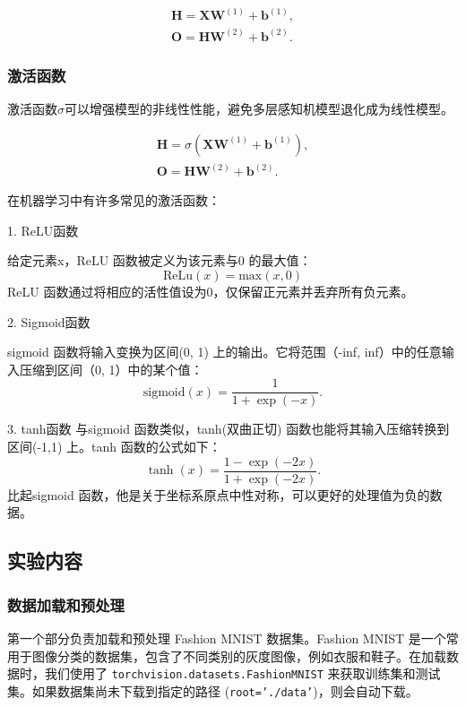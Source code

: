 \documentclass[a4paper,12pt]{article}
\begin{document}
\begin{equation}
\begin{split}
\mathbf{H} = \mathbf{XW}^{(1)} + \mathbf{b}^{(1)},\\
\mathbf{O} = \mathbf{HW}^{(2)} + \mathbf{b}^{(2)}.
\end{split}
\end{equation}

\subsubsection{激活函数}
激活函数$\sigma$可以增强模型的非线性性能，避免多层感知机模型退化成为线性模型。

\begin{equation}
\begin{split}
\mathbf{H} = \sigma(\mathbf{XW}^{(1)} + \mathbf{b}^{(1)}), \\
\mathbf{O} = \mathbf{HW}^{(2)} + \mathbf{b}^{(2)}.
\end{split}
\end{equation}

在机器学习中有许多常见的激活函数：

1. ReLU函数

给定元素x，ReLU 函数被定义为该元素与0 的最大值：
\begin{equation}
\text{ReLu}(x) = \text{max}(x,0)
\end{equation}
ReLU 函数通过将相应的活性值设为0，仅保留正元素并丢弃所有负元素。

2. Sigmoid函数

sigmoid 函数将输入变换为区间(0, 1) 上的输出。它将范围（-inf, inf）中的任意输入压缩到区间（0, 1）中的某个值：
\begin{equation}
\text{sigmoid}(x) = \frac{1}{1 + \exp(-x)}.
\end{equation}

3. tanh函数
与sigmoid 函数类似，tanh(双曲正切) 函数也能将其输入压缩转换到区间(-1,1) 上。tanh 函数的公式如下：
\begin{equation}
\tanh(x) = \frac{1 - \exp(-2x)}{1 + \exp(-2x)}.
\end{equation}
比起sigmoid 函数，他是关于坐标系原点中性对称，可以更好的处理值为负的数据。

\subsection{实验内容}
\subsubsection{数据加载和预处理}
第一个部分负责加载和预处理 Fashion MNIST 数据集。Fashion MNIST 是一个常用于图像分类的数据集，包含了不同类别的灰度图像，例如衣服和鞋子。在加载数据时，我们使用了 \texttt{torchvision.datasets.FashionMNIST} 来获取训练集和测试集。如果数据集尚未下载到指定的路径 (\texttt{root='./data'})，则会自动下载。
\end{document}
